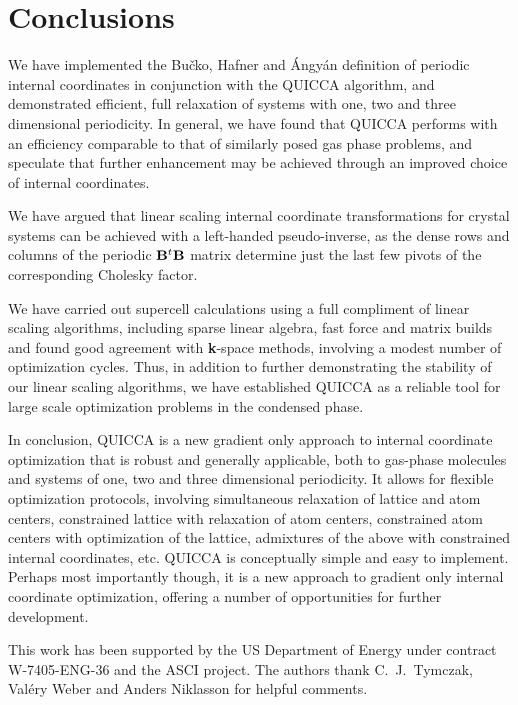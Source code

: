 \twolinestyle{\documentclass[prb,preprint]{revtex4}}
\begin{document}
\section{Conclusions} \label{conclusion}

We have implemented the Bu\v{c}ko, Hafner and {\'A}ngy{\'a}n  \cite{TBucko05}
definition of periodic internal coordinates in conjunction with the QUICCA
algorithm, and demonstrated efficient, full relaxation of systems with 
one, two and three dimensional periodicity.  In general, we have found that
QUICCA performs with an efficiency comparable to that of similarly posed gas 
phase problems, and speculate that further enhancement  may be achieved through
an improved choice of internal coordinates.

We have argued that linear scaling internal coordinate transformations for 
crystal systems can be achieved with a left-handed pseudo-inverse, as the 
dense rows and columns of the periodic ${\bf B}^t {\bf B}$ matrix determine
just the last few pivots of the corresponding Cholesky factor.

We have carried out supercell calculations using a full compliment of
linear scaling algorithms, including sparse linear algebra, fast force and 
matrix builds and found good agreement with {\bf k}-space methods, involving 
a modest number of optimization cycles.  Thus, in addition to further demonstrating 
the stability of our linear scaling algorithms, we have established QUICCA as a 
reliable tool for large scale optimization problems in the condensed phase.

In conclusion, QUICCA is a new gradient only approach to internal coordinate
optimization that is robust and generally applicable, both to gas-phase
molecules and systems of one, two and three dimensional periodicity.  It 
allows for flexible optimization protocols, involving simultaneous 
relaxation of lattice and atom centers, constrained lattice with relaxation of 
atom centers, constrained atom centers with optimization of the lattice,
admixtures of the above with constrained internal coordinates, etc. 
QUICCA is conceptually simple and easy to implement.
Perhaps most importantly though, it is a new approach to gradient only 
internal coordinate optimization, offering a number of opportunities for 
further development.

\begin{acknowledgments}
 This work has been supported by the US Department of Energy 
 under contract W-7405-ENG-36 and the ASCI project.  The authors
 thank C.~J.~Tymczak, Val\'ery Weber and Anders Niklasson for helpful 
 comments.
\end{acknowledgments}
\end{document}
